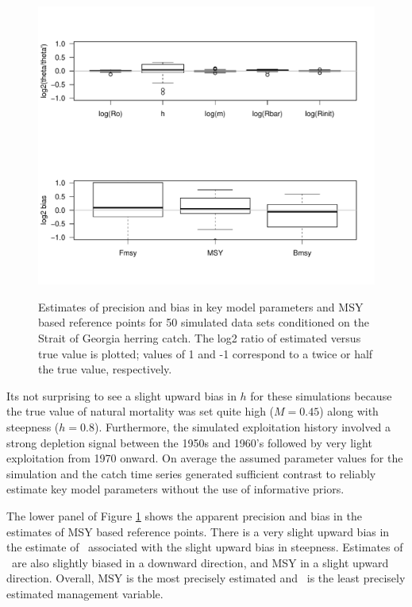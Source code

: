 \begin{figure}[!tbp]
	\includegraphics[width=\textwidth]{../Figs/SOGParameterBias.pdf}\\
	\caption{Estimates of precision and bias in key model parameters and MSY based reference points for 50 simulated data sets conditioned on the Strait of Georgia herring catch. The log2 ratio of estimated versus true value is plotted; values of 1 and -1 correspond to a twice or  half the true value, respectively.}\label{FigSogBias}
\end{figure}

Its not surprising to see a slight upward bias in $h$ for these simulations because the true value of natural mortality was set quite high ($M=0.45$) along with steepness ($h=0.8$).  Furthermore, the simulated exploitation history involved a strong depletion signal between the 1950s and 1960's followed by very light exploitation from 1970 onward.  On average the assumed parameter values for the simulation and the catch time series generated sufficient contrast to reliably estimate key model parameters without the use of informative priors.

The lower panel of Figure \ref{FigSogBias} shows the apparent precision and bias in the estimates of MSY based reference points.  There is a very slight upward bias in the estimate of \fmsy\ associated with the slight upward bias in steepness.  Estimates of \bmsy\ are also slightly biased in a downward direction, and MSY in a slight upward direction.  Overall, MSY is the most precisely estimated and \fmsy\ is the least precisely estimated management variable.


